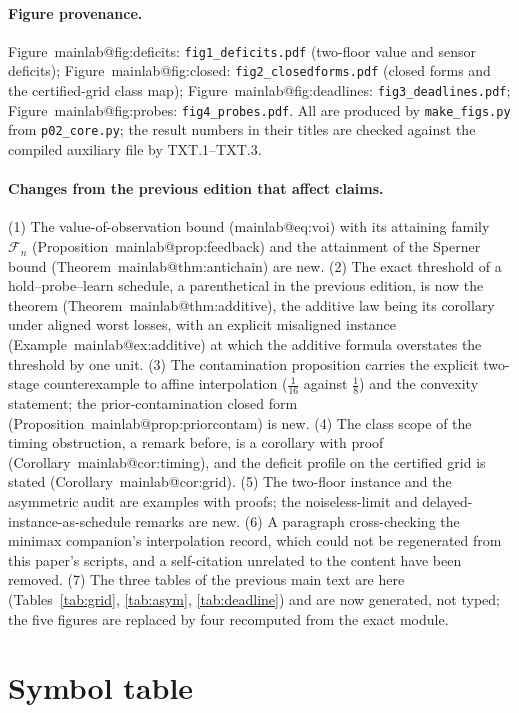 \documentclass[11pt,a4paper]{article}
\makeatletter
\theoremstyle{plain}
\theoremstyle{definition}
\theoremstyle{remark}
\newcommand{\tfr}[2]{\tfrac{#1}{#2}}
\newcommand{\mref}[1]{\csname mainlab@#1\endcsname}
\newcommand{\meqref}[1]{(\mref{#1})}
\makeatother
\begin{document}
\paragraph{Figure provenance.} Figure~\mref{fig:deficits}: \texttt{fig1\_deficits.pdf} (two-floor value and sensor deficits); Figure~\mref{fig:closed}: \texttt{fig2\_closedforms.pdf} (closed forms and the certified-grid class map); Figure~\mref{fig:deadlines}: \texttt{fig3\_deadlines.pdf}; Figure~\mref{fig:probes}: \texttt{fig4\_probes.pdf}. All are produced by \texttt{make\_figs.py} from \texttt{p02\_core.py}; the result numbers in their titles are checked against the compiled auxiliary file by TXT.1--TXT.3.

\paragraph{Changes from the previous edition that affect claims.} (1) The value-of-observation bound \meqref{eq:voi} with its attaining family $\mathcal F_n$ (Proposition~\mref{prop:feedback}) and the attainment of the Sperner bound (Theorem~\mref{thm:antichain}) are new. (2) The exact threshold of a hold--probe--learn schedule, a parenthetical in the previous edition, is now the theorem (Theorem~\mref{thm:additive}), the additive law being its corollary under aligned worst losses, with an explicit misaligned instance (Example~\mref{ex:additive}) at which the additive formula overstates the threshold by one unit. (3) The contamination proposition carries the explicit two-stage counterexample to affine interpolation ($\tfr1{16}$ against $\tfr18$) and the convexity statement; the prior-contamination closed form (Proposition~\mref{prop:priorcontam}) is new. (4) The class scope of the timing obstruction, a remark before, is a corollary with proof (Corollary~\mref{cor:timing}), and the deficit profile on the certified grid is stated (Corollary~\mref{cor:grid}). (5) The two-floor instance and the asymmetric audit are examples with proofs; the noiseless-limit and delayed-instance-as-schedule remarks are new. (6) A paragraph cross-checking the minimax companion's interpolation record, which could not be regenerated from this paper's scripts, and a self-citation unrelated to the content have been removed. (7) The three tables of the previous main text are here (Tables~\ref{tab:grid}, \ref{tab:asym}, \ref{tab:deadline}) and are now generated, not typed; the five figures are replaced by four recomputed from the exact module.
\section{Symbol table}\label{si:symbols}
\end{document}
